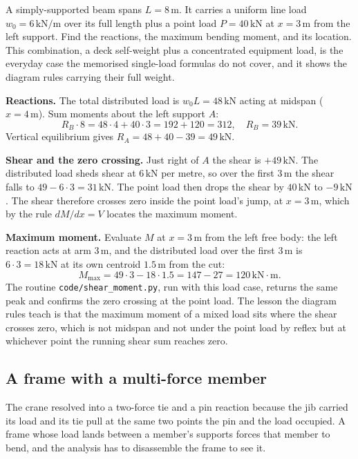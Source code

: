 A simply-supported beam spans $L = 8\,\si{\meter}$. It carries a
uniform line load $w_0 = 6\,\text{kN}/\text{m}$ over its full length
plus a point load $P = 40\,\text{kN}$ at $x = 3\,\si{\meter}$ from the
left support. Find the reactions, the maximum bending moment, and its
location. This combination, a deck self-weight plus a concentrated
equipment load, is the everyday case the memorised single-load formulas
do not cover, and it shows the diagram rules carrying their full weight.

\textbf{Reactions.} The total distributed load is $w_0 L = 48\,\text{kN}$
acting at midspan ($x = 4\,\si{\meter}$). Sum moments about the left
support $A$:
\[
R_B \cdot 8 = 48 \cdot 4 + 40 \cdot 3 = 192 + 120 = 312,\quad
R_B = 39\,\text{kN}.
\]
Vertical equilibrium gives $R_A = 48 + 40 - 39 = 49\,\text{kN}$.

\textbf{Shear and the zero crossing.} Just right of $A$ the shear is
$+49\,\text{kN}$. The distributed load sheds shear at $6\,\text{kN}$ per
metre, so over the first $3\,\si{\meter}$ the shear falls to
$49 - 6 \cdot 3 = 31\,\text{kN}$. The point load then drops the shear by
$40\,\text{kN}$ to $-9\,\text{kN}$. The shear therefore crosses zero
inside the point load's jump, at $x = 3\,\si{\meter}$, which by the rule
$dM/dx = V$ locates the maximum moment.

\textbf{Maximum moment.} Evaluate $M$ at $x = 3\,\si{\meter}$ from the
left free body: the left reaction acts at arm $3\,\si{\meter}$, and the
distributed load over the first $3\,\si{\meter}$ is
$6 \cdot 3 = 18\,\text{kN}$ at its own centroid $1.5\,\si{\meter}$ from
the cut:
\[
M_{\max} = 49 \cdot 3 - 18 \cdot 1.5 = 147 - 27 = 120\,\text{kN}\cdot\text{m}.
\]
The routine \texttt{code/shear\_moment.py}, run with this load case,
returns the same peak and confirms the zero crossing at the point load.
The lesson the diagram rules teach is that the maximum moment of a mixed
load sits where the shear crosses zero, which is not midspan and not
under the point load by reflex but at whichever point the running shear
sum reaches zero.

\subsection{A frame with a multi-force member}

The crane resolved into a two-force tie and a pin reaction because the
jib carried its load and its tie pull at the same two points the pin and
the load occupied. A frame whose load lands between a member's supports
forces that member to bend, and the analysis has to disassemble the frame
to see it.

